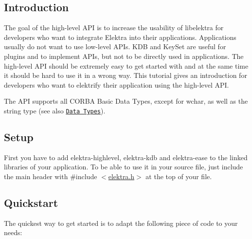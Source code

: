 \subsection*{Introduction}

The goal of the high-\/level A\+PI is to increase the usability of libelektra for developers who want to integrate Elektra into their applications. Applications usually do not want to use low-\/level A\+P\+Is. {\ttfamily K\+DB} and {\ttfamily Key\+Set} are useful for plugins and to implement A\+P\+Is, but not to be directly used in applications. The high-\/level A\+PI should be extremely easy to get started with and at the same time it should be hard to use it in a wrong way. This tutorial gives an introduction for developers who want to elektrify their application using the high-\/level A\+PI.

The A\+PI supports all C\+O\+R\+BA Basic Data Types, except for {\ttfamily wchar}, as well as the {\ttfamily string} type (see also \href{#data-types}{\tt Data Types}).

\subsection*{Setup}

First you have to add {\ttfamily elektra-\/highlevel}, {\ttfamily elektra-\/kdb} and {\ttfamily elektra-\/ease} to the linked libraries of your application. To be able to use it in your source file, just include the main header with {\ttfamily \#include $<$\hyperlink{elektra_8h}{elektra.\+h}$>$} at the top of your file.

\subsection*{Quickstart}

The quickest way to get started is to adapt the following piece of code to your needs\+:


